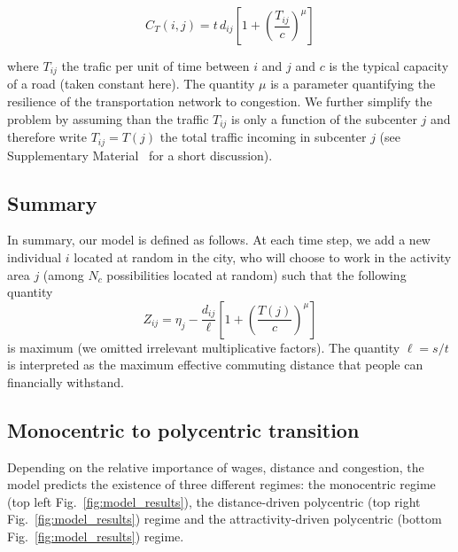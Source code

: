 \begin{equation}
    C_T(i,j) =  t\, d_{ij} \left[ 1 + \left( \frac{T_{ij}}{c} \right)^{\mu} \right]
    \label{eq:commuting_cost}
\end{equation}

where $T_{ij}$ the trafic per unit of time between $i$ and $j$ and $c$
is the typical capacity of a road (taken constant here). The quantity
$\mu$ is a parameter quantifying the resilience of the transportation
network to congestion. We further simplify the problem by assuming
than the traffic $T_{ij}$ is only a function of the subcenter $j$ and
therefore write $T_{ij}=T(j)$ the total traffic incoming in subcenter
$j$ (see Supplementary Material~\cite{SM} for a short discussion).

\subsection{Summary}
\label{sub:summary}


In summary, our model is defined as follows. At each time step, we add
a new individual $i$ located at random in the city, who will
choose to work in the activity area $j$ (among $N_c$ possibilities
located at random) such that the following quantity
%
\begin{equation}
Z_{ij} = \eta_j - \frac{d_{ij}}{\ell} \left[ 1 + \left( \frac{T(j)}{c} \right)^{\mu} \right]
\label{eq:cost_function}
\end{equation}
%
is maximum (we omitted irrelevant multiplicative factors). The quantity $\ell = s/t$ is interpreted as the maximum effective
commuting distance that people can financially withstand. 

\subsection{Monocentric to polycentric transition}
\label{sub:monocentric_to_polycentric_transition}

Depending on the relative importance of wages, distance and congestion, the
model predicts the existence of three different regimes: the monocentric regime
(top left Fig.~\ref{fig:model_results}), the distance-driven polycentric (top
right Fig.~\ref{fig:model_results}) regime and the attractivity-driven
polycentric (bottom Fig.~\ref{fig:model_results}) regime. 


